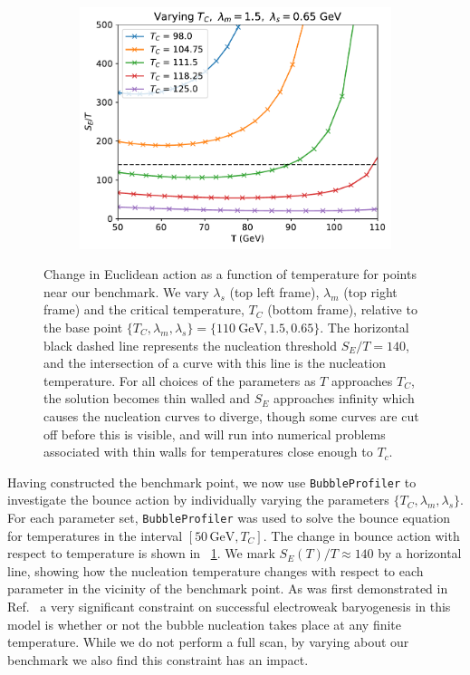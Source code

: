 \documentclass[final,3p,11pt,pdflatex]{elsarticle}
\makeatletter
\newcommand{\bp}{\texttt{BubbleProfiler}\@\xspace}
\newcommand{\figref}[1]{\figurename~\ref{#1}}
\newcommand{\refcite}[1]{Ref.~\cite{#1}}
\makeatother
\begin{document}
\begin{figure}[h!]
\begin{subfigure}[b]{0.49\textwidth}
    \includegraphics[width=\textwidth]{figures/nucleation_plot_Tc.pdf}
  \end{subfigure}
\caption{Change in Euclidean action as a function of temperature for points near our benchmark. We vary $\lambda_s$ (top left frame), $\lambda_m$ (top right frame) and the critical temperature, $T_C$ (bottom frame), relative to the base point $\{T_C,\lambda_m,\lambda_s\} = \{110\ \textrm{GeV},1.5,0.65\}$. The horizontal black dashed line represents the nucleation threshold $S_E / T = 140$, and the intersection of a curve with this line is the nucleation temperature. For all choices of the parameters as $T$ approaches $T_C$, the solution becomes thin walled and $S_E$ approaches infinity which causes the nucleation curves to diverge, though some curves are cut off before this is visible, and will run into numerical problems associated with thin walls for temperatures close enough to $T_c$. }
\label{fig:nucleation_plots}
\end{figure}


Having constructed the benchmark point, we now use \bp to investigate
the bounce action by individually varying the parameters
$\{T_C,\lambda_m,\lambda_s\}$. For each parameter set, \bp was used to
solve the bounce equation for temperatures in the interval
$[50\,\textrm{GeV}, T_C]$. The change in bounce action with respect to
temperature is shown in \figref{fig:nucleation_plots}.  We mark
$S_E(T)/T \approx 140$ by a horizontal line, showing how the
nucleation temperature changes with respect to each parameter in the
vicinity of the benchmark point.  As was first demonstrated in
\refcite{KurupDynamicselectroweakphase2017} a very significant
constraint on successful electroweak baryogenesis in this model is
whether or not the bubble nucleation takes place at any finite
temperature.  While we do not perform a full scan, by varying about
our benchmark we also find this constraint has an impact.
\end{document}
